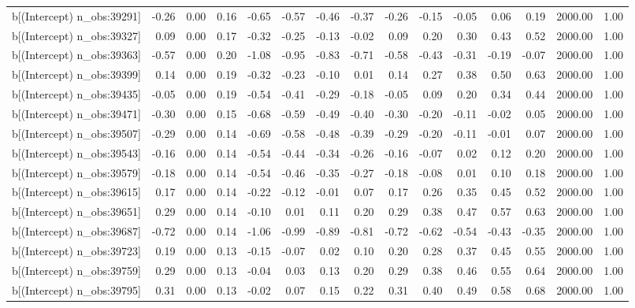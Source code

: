 \begin{table}[ht]
\begin{tabular}{rrrrrrrrrrrrrrr}
  b[(Intercept) n\_obs:39291] & -0.26 & 0.00 & 0.16 & -0.65 & -0.57 & -0.46 & -0.37 & -0.26 & -0.15 & -0.05 & 0.06 & 0.19 & 2000.00 & 1.00 \\ 
  b[(Intercept) n\_obs:39327] & 0.09 & 0.00 & 0.17 & -0.32 & -0.25 & -0.13 & -0.02 & 0.09 & 0.20 & 0.30 & 0.43 & 0.52 & 2000.00 & 1.00 \\ 
  b[(Intercept) n\_obs:39363] & -0.57 & 0.00 & 0.20 & -1.08 & -0.95 & -0.83 & -0.71 & -0.58 & -0.43 & -0.31 & -0.19 & -0.07 & 2000.00 & 1.00 \\ 
  b[(Intercept) n\_obs:39399] & 0.14 & 0.00 & 0.19 & -0.32 & -0.23 & -0.10 & 0.01 & 0.14 & 0.27 & 0.38 & 0.50 & 0.63 & 2000.00 & 1.00 \\ 
  b[(Intercept) n\_obs:39435] & -0.05 & 0.00 & 0.19 & -0.54 & -0.41 & -0.29 & -0.18 & -0.05 & 0.09 & 0.20 & 0.34 & 0.44 & 2000.00 & 1.00 \\ 
  b[(Intercept) n\_obs:39471] & -0.30 & 0.00 & 0.15 & -0.68 & -0.59 & -0.49 & -0.40 & -0.30 & -0.20 & -0.11 & -0.02 & 0.05 & 2000.00 & 1.00 \\ 
  b[(Intercept) n\_obs:39507] & -0.29 & 0.00 & 0.14 & -0.69 & -0.58 & -0.48 & -0.39 & -0.29 & -0.20 & -0.11 & -0.01 & 0.07 & 2000.00 & 1.00 \\ 
  b[(Intercept) n\_obs:39543] & -0.16 & 0.00 & 0.14 & -0.54 & -0.44 & -0.34 & -0.26 & -0.16 & -0.07 & 0.02 & 0.12 & 0.20 & 2000.00 & 1.00 \\ 
  b[(Intercept) n\_obs:39579] & -0.18 & 0.00 & 0.14 & -0.54 & -0.46 & -0.35 & -0.27 & -0.18 & -0.08 & 0.01 & 0.10 & 0.18 & 2000.00 & 1.00 \\ 
  b[(Intercept) n\_obs:39615] & 0.17 & 0.00 & 0.14 & -0.22 & -0.12 & -0.01 & 0.07 & 0.17 & 0.26 & 0.35 & 0.45 & 0.52 & 2000.00 & 1.00 \\ 
  b[(Intercept) n\_obs:39651] & 0.29 & 0.00 & 0.14 & -0.10 & 0.01 & 0.11 & 0.20 & 0.29 & 0.38 & 0.47 & 0.57 & 0.63 & 2000.00 & 1.00 \\ 
  b[(Intercept) n\_obs:39687] & -0.72 & 0.00 & 0.14 & -1.06 & -0.99 & -0.89 & -0.81 & -0.72 & -0.62 & -0.54 & -0.43 & -0.35 & 2000.00 & 1.00 \\ 
  b[(Intercept) n\_obs:39723] & 0.19 & 0.00 & 0.13 & -0.15 & -0.07 & 0.02 & 0.10 & 0.20 & 0.28 & 0.37 & 0.45 & 0.55 & 2000.00 & 1.00 \\ 
  b[(Intercept) n\_obs:39759] & 0.29 & 0.00 & 0.13 & -0.04 & 0.03 & 0.13 & 0.20 & 0.29 & 0.38 & 0.46 & 0.55 & 0.64 & 2000.00 & 1.00 \\ 
  b[(Intercept) n\_obs:39795] & 0.31 & 0.00 & 0.13 & -0.02 & 0.07 & 0.15 & 0.22 & 0.31 & 0.40 & 0.49 & 0.58 & 0.68 & 2000.00 & 1.00 \\ 

\end{tabular}
\end{table}
